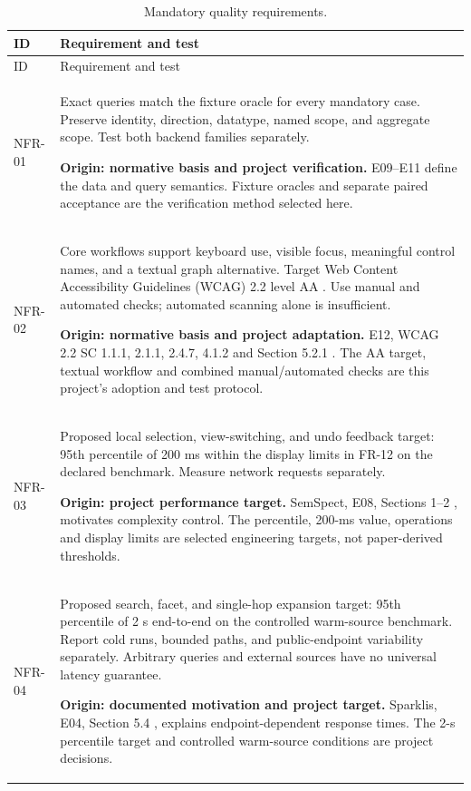 \documentclass[11pt,a4paper]{article}
\begin{document}
{\small
\begin{longtable}{@{}P{1.35cm}P{14.35cm}@{}}
\caption{Mandatory quality requirements.}\label{tab:nfr}\\
\toprule ID & Requirement and test\\\midrule
\endfirsthead\toprule ID & Requirement and test\\\midrule\endhead
\bottomrule\endlastfoot
NFR-01 & Exact queries match the fixture oracle for every mandatory case. Preserve identity, direction, datatype, named scope, and aggregate scope. Test both backend families separately.\par\smallskip \textbf{Origin: normative basis and project verification.} E09--E11 \citep{rdfconcepts,sparql,opencypher} define the data and query semantics. Fixture oracles and separate paired acceptance are the verification method selected here.\\
NFR-02 & Core workflows support keyboard use, visible focus, meaningful control names, and a textual graph alternative. Target Web Content Accessibility Guidelines (WCAG) 2.2 level AA \citep{wcag}. Use manual and automated checks; automated scanning alone is insufficient.\par\smallskip \textbf{Origin: normative basis and project adaptation.} E12, WCAG 2.2 SC 1.1.1, 2.1.1, 2.4.7, 4.1.2 and Section 5.2.1 \citep{wcag}. The AA target, textual workflow and combined manual/automated checks are this project's adoption and test protocol.\\
NFR-03 & Proposed local selection, view-switching, and undo feedback target: 95th percentile of 200 ms within the display limits in FR-12 on the declared benchmark. Measure network requests separately.\par\smallskip \textbf{Origin: project performance target.} SemSpect, E08, Sections 1--2 \citep{semspect}, motivates complexity control. The percentile, 200-ms value, operations and display limits are selected engineering targets, not paper-derived thresholds.\\
NFR-04 & Proposed search, facet, and single-hop expansion target: 95th percentile of 2 s end-to-end on the controlled warm-source benchmark. Report cold runs, bounded paths, and public-endpoint variability separately. Arbitrary queries and external sources have no universal latency guarantee.\par\smallskip \textbf{Origin: documented motivation and project target.} Sparklis, E04, Section 5.4 \citep{sparklis}, explains endpoint-dependent response times. The 2-s percentile target and controlled warm-source conditions are project decisions.\\

\end{longtable}}
\end{document}

